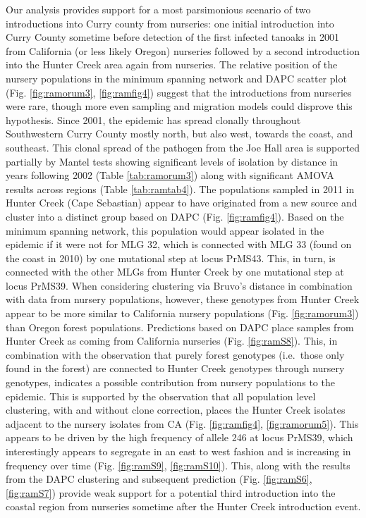 \documentclass[double,12pt]{beavtex}
\begin{document}
  Our analysis provides support for a most parsimonious scenario of two
  introductions into Curry county from nurseries: one initial introduction
  into Curry County sometime before detection of the first infected
  tanoaks in 2001 from California (or less likely Oregon) nurseries
  followed by a second introduction into the Hunter Creek area again from
  nurseries. The relative position of the nursery populations in the
  minimum spanning network and DAPC scatter plot (Fig. \ref{fig:ramorum3},
  \ref{fig:ramfig4}) suggest that the introductions from nurseries were
  rare, though more even sampling and migration models could disprove this
  hypothesis. Since 2001, the epidemic has spread clonally throughout
  Southwestern Curry County mostly north, but also west, towards the
  coast, and southeast. This clonal spread of the pathogen from the Joe
  Hall area is supported partially by Mantel tests showing significant
  levels of isolation by distance in years following 2002 (Table
  \ref{tab:ramorum3}) along with significant AMOVA results across regions
  (Table \ref{tab:ramtab4}). The populations sampled in 2011 in Hunter
  Creek (Cape Sebastian) appear to have originated from a new source and
  cluster into a distinct group based on DAPC (Fig. \ref{fig:ramfig4}).
  Based on the minimum spanning network, this population would appear
  isolated in the epidemic if it were not for MLG 32, which is connected
  with MLG 33 (found on the coast in 2010) by one mutational step at locus
  PrMS43. This, in turn, is connected with the other MLGs from Hunter
  Creek by one mutational step at locus PrMS39. When considering
  clustering via Bruvo's distance in combination with data from nursery
  populations, however, these genotypes from Hunter Creek appear to be
  more similar to California nursery populations (Fig. \ref{fig:ramorum3})
  than Oregon forest populations. Predictions based on DAPC place samples
  from Hunter Creek as coming from California nurseries (Fig.
  \ref{fig:ramS8}). This, in combination with the observation that purely
  forest genotypes (i.e.~those only found in the forest) are connected to
  Hunter Creek genotypes through nursery genotypes, indicates a possible
  contribution from nursery populations to the epidemic. This is supported
  by the observation that all population level clustering, with and
  without clone correction, places the Hunter Creek isolates adjacent to
  the nursery isolates from CA (Fig. \ref{fig:ramfig4},
  \ref{fig:ramorum5}). This appears to be driven by the high frequency of
  allele 246 at locus PrMS39, which interestingly appears to segregate in
  an east to west fashion and is increasing in frequency over time (Fig.
  \ref{fig:ramS9}, \ref{fig:ramS10}). This, along with the results from
  the DAPC clustering and subsequent prediction (Fig. \ref{fig:ramS6},
  \ref{fig:ramS7}) provide weak support for a potential third introduction
  into the coastal region from nurseries sometime after the Hunter Creek
  introduction event.
  
\end{document}
